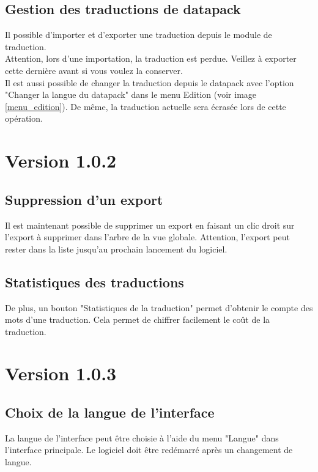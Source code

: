 \subsection{Gestion des traductions de datapack}
Il possible d'importer et d'exporter une traduction depuis le module de traduction.\\

Attention, lors d'une importation, la traduction est perdue. Veillez à exporter cette dernière avant si vous voulez la conserver.\\

Il est aussi possible de changer la traduction depuis le datapack avec l'option "Changer la langue du datapack" dans le menu Edition (voir image \ref{menu_edition}). De même, la traduction actuelle sera écrasée lors de cette opération.\\



\section{Version 1.0.2}
\subsection{Suppression d'un export}
Il est maintenant possible de supprimer un export en faisant un clic droit sur l'export à supprimer dans l'arbre de la vue globale. Attention, l'export peut rester dans la liste jusqu'au prochain lancement du logiciel.\\ 


\subsection{Statistiques des traductions}
De plus, un bouton "Statistiques de la traduction" permet d'obtenir le compte des mots d'une traduction. Cela permet de chiffrer facilement le coût de la traduction.\\ 

\section{Version 1.0.3}
\subsection{Choix de la langue de l'interface}
La langue de l'interface peut être choisie à l'aide du menu "Langue" dans l'interface principale. Le logiciel doit être redémarré après un changement de langue.\\

